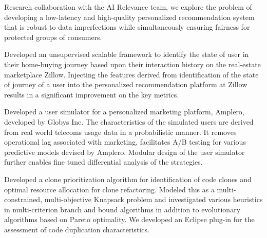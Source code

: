 \documentclass[10pt]{moderncv}
\begin{document}
{
    Research collaboration with the AI Relevance team, we explore the problem of developing a low-latency and
        high-quality personalized recommendation system that is robust to data imperfections while simultaneously 
        ensuring fairness for protected groups of consumers.
}

{
    Developed an unsupervised scalable framework to identify the state of user in their home-buying journey based upon 
        their interaction history on the real-estate marketplace Zillow. 
    Injecting the features derived from identification of the state of journey of a user into the personalized 
        recommendation platform at Zillow results in a significant improvement on the key metrics.
}

{
    Developed a user simulator for a personalized marketing platform, Amplero, developed by Globys Inc. 
    The characteristics of the simulated users are derived from real world telecoms usage data in a probabilistic 
        manner. 
    It removes operational lag associated with marketing, facilitates A/B testing for various predictive models 
        devised by Amplero. 
    Modular design of the user simulator further enables fine tuned differential analysis of the strategies.
}

{
    Developed a clone prioritization algorithm for identification of code clones and optimal resource allocation for 
        clone refactoring. 
    Modeled this as a multi-constrained, multi-objective Knapsack problem and investigated various heuristics in 
        multi-criterion branch and bound algorithms in addition to evolutionary algorithms based on Pareto optimality. 
    We developed an Eclipse plug-in for the assessment of code duplication characteristics.
}
\end{document}
